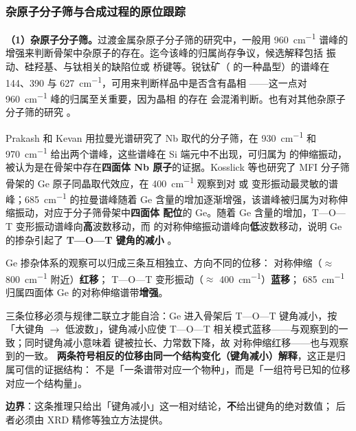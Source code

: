 \subsubsection{杂原子分子筛与合成过程的原位跟踪}

\textbf{（1）杂原子分子筛。}过渡金属杂原子分子筛的研究中，一般用 \qty{960}{cm^{-1}}
谱峰的增强来判断骨架中杂原子的存在。迄今该峰的归属尚存争议，候选解释包括
 振动、硅羟基、与钛相关的缺陷位或  桥键等。锐钛矿（
的一种晶型）的谱峰在 144、390 与 \qty{627}{cm^{-1}}，可用来判断样品中是否含有晶相
——这一点对 \qty{960}{cm^{-1}} 峰的归属至关重要，因为晶相  的存在
会混淆判断。也有对其他杂原子分子筛的研究
。

Prakash 和 Kevan 用拉曼光谱研究了 Nb 取代的分子筛，在 \qty{930}{cm^{-1}} 和
\qty{970}{cm^{-1}} 给出两个谱峰，这些谱峰在 Si 端元中不出现，可归属为
 的伸缩振动，被认为是在骨架中存在\textbf{四面体 Nb 原子}的证据。Kosslick
等也研究了 MFI 分子筛骨架的 Ge 原子同晶取代效应，在 \qty{400}{cm^{-1}} 观察到对
 或  变形振动最灵敏的谱峰；\qty{685}{cm^{-1}} 的拉曼谱峰随着
Ge 含量的增加逐渐增强，该谱峰被归属为对称伸缩振动，对应于分子筛骨架中\textbf{四面体
配位}的 Ge。随着 Ge 含量的增加，T—O—T 变形振动谱峰向\textbf{高}波数移动，而
 的对称伸缩振动谱峰向\textbf{低}波数移动，说明 Ge 的掺杂引起了
\textbf{T—O—T 键角的减小}
。

\begin{obs}
Ge 掺杂体系的观察可以归成三条互相独立、方向不同的位移：
 对称伸缩（$\approx$ \qty{800}{cm^{-1}} 附近）\textbf{红移}；
T—O—T 变形振动（$\approx$ \qty{400}{cm^{-1}}）\textbf{蓝移}；
\qty{685}{cm^{-1}} 归属四面体 Ge 的对称伸缩谱带\textbf{增强}。
\end{obs}

\begin{infer}
三条位移必须与规律二联立才能自洽：Ge 进入骨架后 T—O—T 键角减小，按「大键角 $\rightarrow$
低波数」，键角减小应使 T—O—T 相关模式蓝移——与观察到的一致；同时键角减小意味着
 键被拉长、力常数下降，故  对称伸缩红移——也与观察到的一致。
\textbf{两条符号相反的位移由同一个结构变化（键角减小）解释}，这正是归属可信的证据结构：
不是「一条谱带对应一个物种」，而是「一组符号已知的位移对应一个结构量」。

\textbf{边界}：这条推理只给出「键角减小」这一相对结论，\textbf{不}给出键角的绝对数值；
后者必须由 XRD 精修等独立方法提供。
\end{infer}


